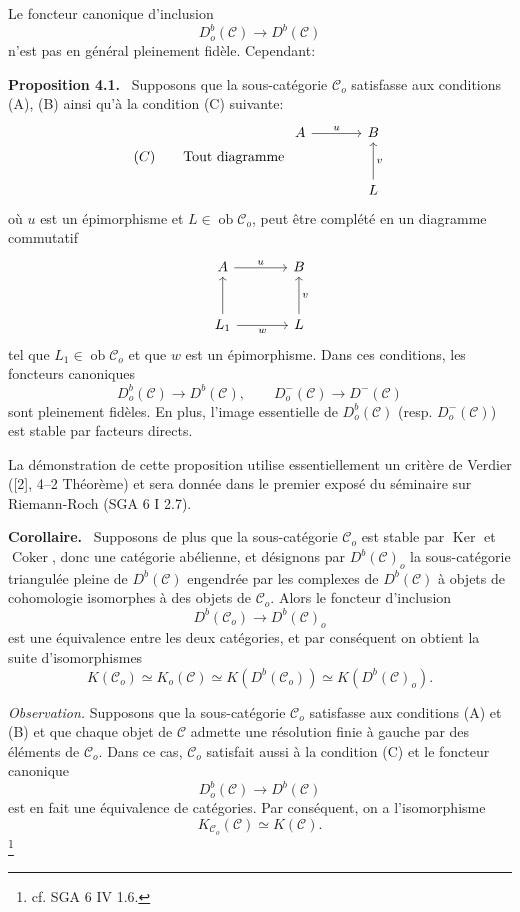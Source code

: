 \documentclass[11pt]{article}
\newenvironment{statement}[1]{\par\medskip\noindent\textbf{#1.}\ }{\par\medskip}
\providecommand{\Ker}{\operatorname{Ker}}
\providecommand{\Coker}{\operatorname{Coker}}
\providecommand{\Ob}{\operatorname{ob}}
\providecommand{\cC}{\mathcal C}
\providecommand{\Ker}{\operatorname{Ker}}
\providecommand{\Coker}{\operatorname{Coker}}
\providecommand{\Ker}{\operatorname{Ker}}
\providecommand{\Coker}{\operatorname{Coker}}
\providecommand{\Ob}{\operatorname{ob}}
\providecommand{\cC}{\mathcal C}
\providecommand{\Ob}{\operatorname{Ob}}
\providecommand{\Ob}{\operatorname{ob}}
\providecommand{\Ob}{\operatorname{Ob}}
\begin{document}
Le foncteur canonique d'inclusion
\[
D_o^b(\cC)\longrightarrow D^b(\cC)
\]
n'est pas en général pleinement fidèle. Cependant:

\begin{statement}{Proposition 4.1}
Supposons que la sous-catégorie $\cC_o$ satisfasse aux conditions (A), (B) ainsi qu'à la condition (C) suivante:
\[
(C)\qquad
\text{Tout diagramme }
\begin{tikzcd}[column sep=large,row sep=large]
A \arrow[r,"u"]&B\\
&L \arrow[u,"v"']
\end{tikzcd}
\]
où $u$ est un épimorphisme et $L\in\Ob\cC_o$, peut être complété en un diagramme commutatif
\[
\begin{tikzcd}[column sep=large,row sep=large]
A \arrow[r,"u"]&B\\
L_1 \arrow[u] \arrow[r,"w"']&L \arrow[u,"v"']
\end{tikzcd}
\]
tel que $L_1\in\Ob\cC_o$ et que $w$ est un épimorphisme. Dans ces conditions, les foncteurs canoniques
\[
D_o^b(\cC)\longrightarrow D^b(\cC),\qquad
D_o^-(\cC)\longrightarrow D^-(\cC)
\]
sont pleinement fidèles. En plus, l'image essentielle de $D_o^b(\cC)$ (resp. $D_o^-(\cC)$) est stable par facteurs directs.
\end{statement}

La démonstration de cette proposition utilise essentiellement un critère de Verdier ([2], 4--2 Théorème) et sera donnée dans le premier exposé du séminaire sur Riemann-Roch (SGA 6 I 2.7).

\begin{statement}{Corollaire}
Supposons de plus que la sous-catégorie $\cC_o$ est stable par $\Ker$ et $\Coker$, donc une catégorie abélienne, et désignons par $D^b(\cC)_o$ la sous-catégorie triangulée pleine de $D^b(\cC)$ engendrée par les complexes de $D^b(\cC)$ à objets de cohomologie isomorphes à des objets de $\cC_o$. Alors le foncteur d'inclusion
\[
D^b(\cC_o)\longrightarrow D^b(\cC)_o
\]
est une équivalence entre les deux catégories, et par conséquent on obtient la suite d'isomorphismes
\[
K(\cC_o)\simeq K_o(\cC)\simeq K(D^b(\cC_o))\simeq K(D^b(\cC)_o).
\tag{*}
\]
\end{statement}

\emph{Observation.} Supposons que la sous-catégorie $\cC_o$ satisfasse aux conditions (A) et (B) et que chaque objet de $\cC$ admette une résolution finie à gauche par des éléments de $\cC_o$. Dans ce cas, $\cC_o$ satisfait aussi à la condition (C) et le foncteur canonique
\[
D_o^b(\cC)\longrightarrow D^b(\cC)
\]
est en fait une équivalence de catégories. Par conséquent, on a l'isomorphisme
\[
K_{\cC_o}(\cC)\simeq K(\cC).
\]
\footnote{cf. SGA 6 IV 1.6.}
\end{document}

